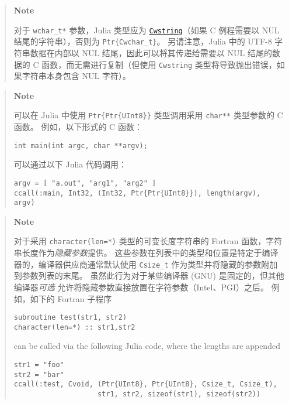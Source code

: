 \begin{quote}
\textbf{Note}

对于 \texttt{wchar\_t*} 参数，Julia 类型应为 \hyperlink{510630608879002831}{\texttt{Cwstring}}（如果 C 例程需要以 NUL 结尾的字符串），否则为 \texttt{Ptr\{Cwchar\_t\}}。 另请注意，Julia 中的 UTF-8 字符串数据在内部以 NUL 结尾，因此可以将其传递给需要以 NUL 结尾的数据的 C 函数，而无需进行复制（但使用 \texttt{Cwstring} 类型将导致抛出错误，如果字符串本身包含 NUL 字符）。

\end{quote}


\begin{quote}
\textbf{Note}

可以在 Julia 中使用 \texttt{Ptr\{Ptr\{UInt8\}\}} 类型调用采用 \texttt{char**} 类型参数的 C 函数。 例如，以下形式的 C 函数：


\begin{lstlisting}
int main(int argc, char **argv);
\end{lstlisting}

可以通过以下 Julia 代码调用：


\begin{verbatim}
argv = [ "a.out", "arg1", "arg2" ]
ccall(:main, Int32, (Int32, Ptr{Ptr{UInt8}}), length(argv), argv)
\end{verbatim}

\end{quote}


\begin{quote}
\textbf{Note}

对于采用 \texttt{character(len=*)} 类型的可变长度字符串的 Fortran 函数，字符串长度作为\emph{隐藏参数}提供。 这些参数在列表中的类型和位置是特定于编译器的，编译器供应商通常默认使用 \texttt{Csize\_t} 作为类型并将隐藏的参数附加到参数列表的末尾。 虽然此行为对于某些编译器 (GNU) 是固定的，但其他编译器\emph{可选} 允许将隐藏参数直接放置在字符参数（Intel、PGI）之后。 例如，如下的 Fortran 子程序


\begin{lstlisting}
subroutine test(str1, str2)
character(len=*) :: str1,str2
\end{lstlisting}

can be called via the following Julia code, where the lengths are appended


\begin{verbatim}
str1 = "foo"
str2 = "bar"
ccall(:test, Cvoid, (Ptr{UInt8}, Ptr{UInt8}, Csize_t, Csize_t),
                    str1, str2, sizeof(str1), sizeof(str2))
\end{verbatim}

\end{quote}


